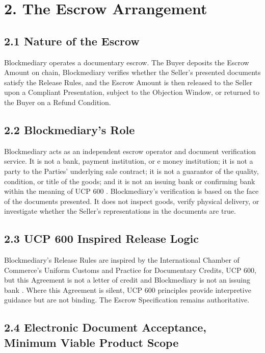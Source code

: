 \documentclass[12pt, a4paper]{article}
\begin{document}
\section*{2. The Escrow Arrangement}

\subsection*{2.1 Nature of the Escrow}

Blockmediary operates a documentary escrow. The Buyer deposits the Escrow Amount on
chain, Blockmediary verifies whether the Seller's presented documents satisfy the Release
Rules, and the Escrow Amount is then released to the Seller upon a Compliant Presentation,
subject to the Objection Window, or returned to the Buyer on a Refund Condition.

\subsection*{2.2 Blockmediary's Role}

Blockmediary acts as an independent escrow operator and document verification service. It
is not a bank, payment institution, or e money institution; it is not a party to the
Parties' underlying sale contract; it is not a guarantor of the quality, condition, or
title of the goods; and it is not an issuing bank or confirming bank within the meaning of
UCP 600 \citep{ucp600}. Blockmediary's verification is based on the face of the documents
presented. It does not inspect goods, verify physical delivery, or investigate whether the
Seller's representations in the documents are true.

\subsection*{2.3 UCP 600 Inspired Release Logic}

Blockmediary's Release Rules are inspired by the International Chamber of Commerce's
Uniform Customs and Practice for Documentary Credits, UCP 600, but this Agreement is not a
letter of credit and Blockmediary is not an issuing bank \citep{ucp600}. Where this
Agreement is silent, UCP 600 principles provide interpretive guidance but are not binding.
The Escrow Specification remains authoritative.

\subsection*{2.4 Electronic Document Acceptance, Minimum Viable Product Scope}
\end{document}
